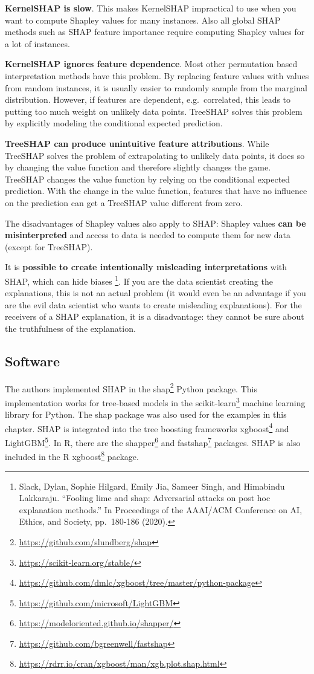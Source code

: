 \documentclass[
  11pt,
]{scrbook}
\renewcommand{\href}[2]{#2\footnote{\url{#1}}}
\begin{document}
\textbf{KernelSHAP is slow}.
This makes KernelSHAP impractical to use when you want to compute Shapley values for many instances.
Also all global SHAP methods such as SHAP feature importance require computing Shapley values for a lot of instances.

\textbf{KernelSHAP ignores feature dependence}.
Most other permutation based interpretation methods have this problem.
By replacing feature values with values from random instances, it is usually easier to randomly sample from the marginal distribution.
However, if features are dependent, e.g.~correlated, this leads to putting too much weight on unlikely data points.
TreeSHAP solves this problem by explicitly modeling the conditional expected prediction.

\textbf{TreeSHAP can produce unintuitive feature attributions}.
While TreeSHAP solves the problem of extrapolating to unlikely data points, it does so by changing the value function and therefore slightly changes the game.
TreeSHAP changes the value function by relying on the conditional expected prediction.
With the change in the value function, features that have no influence on the prediction can get a TreeSHAP value different from zero.

The disadvantages of Shapley values also apply to SHAP:
Shapley values \textbf{can be misinterpreted} and access to data is needed to compute them for new data (except for TreeSHAP).

It is \textbf{possible to create intentionally misleading interpretations} with SHAP, which can hide biases \footnote{Slack, Dylan, Sophie Hilgard, Emily Jia, Sameer Singh, and Himabindu Lakkaraju. ``Fooling lime and shap: Adversarial attacks on post hoc explanation methods.'' In Proceedings of the AAAI/ACM Conference on AI, Ethics, and Society, pp.~180-186 (2020).}.
If you are the data scientist creating the explanations, this is not an actual problem (it would even be an advantage if you are the evil data scientist who wants to create misleading explanations).
For the receivers of a SHAP explanation, it is a disadvantage: they cannot be sure about the truthfulness of the explanation.

\hypertarget{software-5}{%
\subsection{Software}\label{software-5}}

The authors implemented SHAP in the \href{https://github.com/slundberg/shap}{shap} Python package.
This implementation works for tree-based models in the \href{https://scikit-learn.org/stable/}{scikit-learn} machine learning library for Python.
The shap package was also used for the examples in this chapter.
SHAP is integrated into the tree boosting frameworks \href{https://github.com/dmlc/xgboost/tree/master/python-package}{xgboost} and \href{https://github.com/microsoft/LightGBM}{LightGBM}.
In R, there are the \href{https://modeloriented.github.io/shapper/}{shapper} and \href{https://github.com/bgreenwell/fastshap}{fastshap} packages.
SHAP is also included in the R \href{https://rdrr.io/cran/xgboost/man/xgb.plot.shap.html}{xgboost} package.
\end{document}

